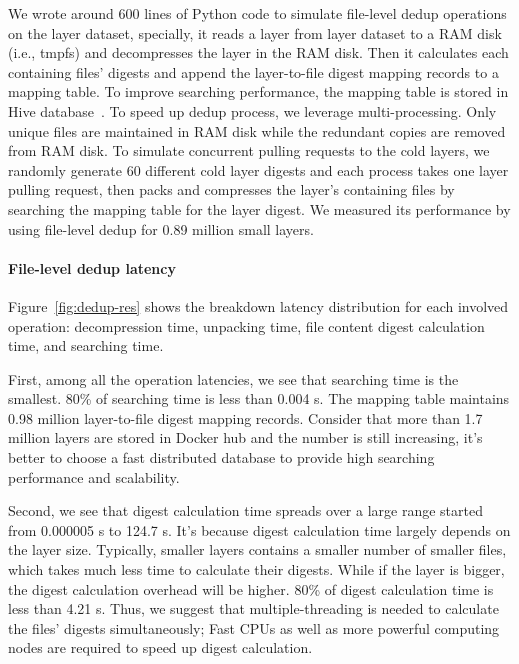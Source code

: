 We wrote around 600 lines of Python code to simulate file-level dedup operations on the layer dataset, specially, it reads a layer from layer dataset to a RAM disk (i.e., tmpfs) and decompresses the layer in the RAM disk. Then it calculates each containing files' digests and append the layer-to-file digest mapping records to a mapping table. To improve searching performance, the mapping table is stored in Hive database~\cite{xxx}. To speed up dedup process, we leverage multi-processing. Only unique files are maintained in RAM disk while the redundant copies are removed from RAM disk. To simulate concurrent pulling requests to the cold layers, we randomly generate 60 different cold layer digests and each process takes one layer pulling request, then packs and compresses the layer's containing files by searching the mapping table for the layer digest. We measured its performance by using file-level dedup for 0.89 million small layers.

\paragraph{File-level dedup latency}

%
Figure~\ref{fig:dedup-res} shows the breakdown latency distribution for each involved operation: decompression time, unpacking time, file content digest calculation time, and searching time.

First, among all the operation latencies, we see that searching time is the smallest. 80\% of searching time is less than 0.004 s. The mapping table maintains 0.98 million layer-to-file digest mapping records. Consider that more than 1.7 million layers are stored in Docker hub and the number is still increasing, it's better to choose a fast distributed database to provide high searching performance and scalability.
  
Second, we see that digest calculation time spreads over a large range started from 0.000005 s to 124.7 s. It's because digest calculation time largely depends on the layer size. Typically, smaller layers contains a smaller number of smaller files, which takes much less time to calculate their digests. While if the layer is bigger, the digest calculation overhead will be higher. 80\% of digest calculation time is less than 4.21 s. 
Thus, we suggest that multiple-threading is needed to calculate the files' digests simultaneously; Fast CPUs as well as more powerful computing nodes are required to speed up digest calculation.

